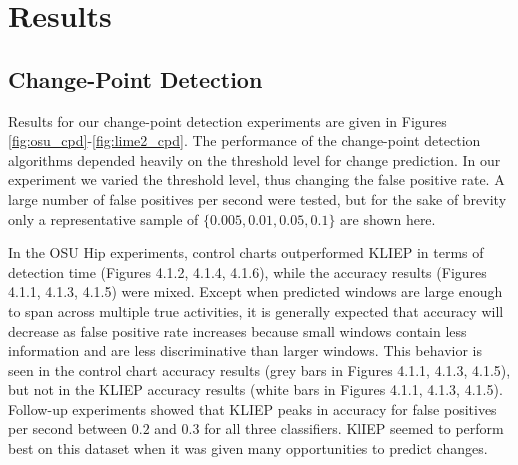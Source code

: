 \chapter{Results}
%

\section{Change-Point Detection}
\label{sec:cpd_results}

Results for our change-point detection experiments are given in
Figures \ref{fig:osu_cpd}-\ref{fig:lime2_cpd}.
The performance of the change-point detection algorithms
depended heavily on the threshold level for change prediction. In our
experiment we varied the threshold level, thus changing the false positive
rate. A large number of false positives per
second were tested, but for the sake of brevity only a representative sample
of $\{0.005, 0.01, 0.05, 0.1\}$ are shown here.

In the OSU Hip experiments, control charts outperformed KLIEP in terms of
detection time (Figures 4.1.2, 4.1.4, 4.1.6), while the accuracy results 
(Figures 4.1.1, 4.1.3, 4.1.5) were
mixed. Except when predicted windows are large enough to span across multiple
true activities, it is generally expected that accuracy will decrease as false
positive rate increases because small windows contain less information and are
less discriminative than larger windows. This behavior is seen in the control chart
accuracy results (grey bars in Figures 4.1.1, 4.1.3, 4.1.5), but not in the
KLIEP accuracy results (white bars in Figures 4.1.1, 4.1.3, 4.1.5).
Follow-up experiments showed that KLIEP peaks in accuracy for
false positives per second between $0.2$ and $0.3$ for all three classifiers.
KlIEP seemed to perform best on this dataset when it was given many
opportunities to predict changes.


